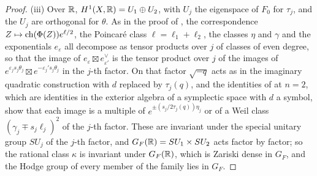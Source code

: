 \begin{proof}
(iii) Over $\mathbb{R}$, $H^{1}(X,\mathbb{R})=U_{1}\oplus U_{2}$, with $U_{j}$ the eigenspace
of $F_{0}$ for $\tau_{j}$, and the $U_{j}$ are orthogonal for $\theta$. As in
the proof of , the correspondence $Z\mapsto\operatorname{ch}(\Phi(Z))
e^{\ell/2}$, the Poincar\'e class $\ell=\ell_{1}+\ell_{2}$, the classes $\eta$
and $\gamma$ and the exponentials $e_{\varepsilon}$ all decompose as tensor
products over $j$ of classes of even degree, so that the image of
$e_{\varepsilon}\boxtimes e_{\varepsilon'}^{\vee}$ is the tensor product over $j$
of the images of $e^{\varepsilon_{j}s_{j}\theta_{j}}\boxtimes
e^{-\varepsilon_{j}'s_{j}\theta_{j}}$ in the $j$-th factor. On that factor
$\sqrt{-q}$ acts as in the imaginary quadratic construction with $d$ replaced
by $\tau_{j}(q)$, and the identities of  at $n=2$, which
are identities in the exterior algebra of a symplectic space with $d$ a
symbol, show that each image is a multiple of $e^{\pm(s_{j}/2\tau_{j}(q))\eta_{j}}$
or of a Weil class $(\gamma_{j}\mp s_{j}\ell_{j})^{2}$ of the $j$-th factor.
These are invariant under the special unitary group $SU_{j}$ of the $j$-th
factor, and $G_{F}(\mathbb{R})=SU_{1}\times SU_{2}$ acts factor by factor; so the
rational class $\kappa$ is invariant under $G_{F}(\mathbb{R})$, which is Zariski dense
in $G_{F}$, and the Hodge group of every member of the family lies in $G_{F}$.
\end{proof}

